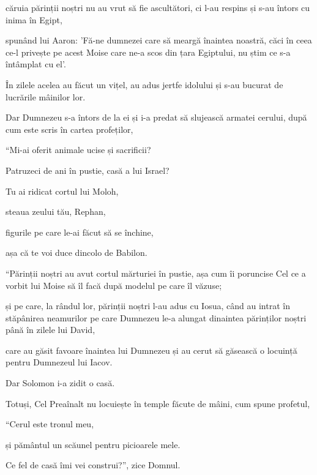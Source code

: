 {căruia părinții noștri nu au vrut să fie ascultători, ci l-au respins și s-au întors cu inima în Egipt,

spunând lui Aaron: 'Fă-ne dumnezei care să meargă înaintea noastră, căci în ceea ce-l privește pe acest Moise care ne-a scos din țara Egiptului, nu știm ce s-a întâmplat cu el'.

În zilele acelea au făcut un vițel, au adus jertfe idolului și s-au bucurat de lucrările mâinilor lor.

Dar Dumnezeu s-a întors de la ei și i-a predat să slujească armatei cerului, după cum este scris în cartea profeților,

\par }{\Q “Mi-ai oferit animale ucise și sacrificii?

\par }{\QB Patruzeci de ani în pustie, casă a lui Israel?


\par }{\Q {}Tu ai ridicat cortul lui Moloh,

\par }{\QB steaua zeului tău, Rephan,

\par }{\Q figurile pe care le-ai făcut să se închine,

\par }{\QB așa că te voi duce dincolo de Babilon.


\par }{\PP {}“Părinții noștri au avut cortul mărturiei în pustie, așa cum îi poruncise Cel ce a vorbit lui Moise să îl facă după modelul pe care îl văzuse;

și pe care, la rândul lor, părinții noștri l-au adus cu Iosua, când au intrat în stăpânirea neamurilor pe care Dumnezeu le-a alungat dinaintea părinților noștri până în zilele lui David,

care au găsit favoare înaintea lui Dumnezeu și au cerut să găsească o locuință pentru Dumnezeul lui Iacov.

Dar Solomon i-a zidit o casă.

Totuși, Cel Preaînalt nu locuiește în temple făcute de mâini, cum spune profetul,


\par }{\Q {}“Cerul este tronul meu,

\par }{\QB și pământul un scăunel pentru picioarele mele.

\par }{\Q Ce fel de casă îmi vei construi?”, zice Domnul.

}
